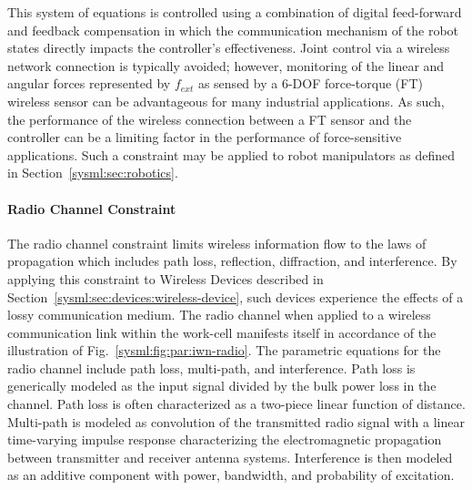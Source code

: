 This system of equations is controlled using a combination of digital feed-forward and feedback compensation in which the communication mechanism of the robot states directly impacts the controller's effectiveness. Joint control via a wireless network connection is typically avoided; however, monitoring of the linear and angular forces represented by $f_{\!ext}$ as sensed by a 6-DOF force-torque (FT) wireless sensor can be advantageous for many industrial applications.  As such, the performance of the wireless connection between a FT sensor and the controller can be a limiting factor in the performance of force-sensitive applications. Such a constraint may be applied to robot manipulators as defined in Section~\ref{sysml:sec:robotics}.

\paragraph{Radio Channel Constraint}\label{sysml:sec:constraints:radio}

The radio channel constraint limits wireless information flow to the laws of propagation which includes path loss, reflection, diffraction, and interference.  By applying this constraint to Wireless Devices described in Section~\ref{sysml:sec:devices:wireless-device}, such devices experience the effects of a lossy communication medium. The radio channel when applied to a wireless communication link within the work-cell manifests itself in accordance of the illustration of Fig.~\ref{sysml:fig:par:iwn-radio}.  The parametric equations for the radio channel include path loss, multi-path, and interference.  Path loss is generically modeled as the input signal divided by the bulk power loss in the channel. Path loss is often characterized as a two-piece linear function of distance\cite{Candell2017.NIST1951}. Multi-path is modeled as convolution of the transmitted radio signal with a linear time-varying impulse response characterizing the electromagnetic propagation between transmitter and receiver antenna systems.  Interference is then modeled as an additive component with power, bandwidth, and probability of excitation.

